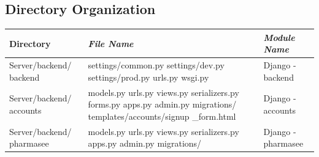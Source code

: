 \documentclass[conference]{IEEEtran}
\begin{document}
\subsection{Directory Organization}
\noindent
\newpage
\par \begin{table}[h!]
\begin{tabular}{|p{}|p{}|p{}|}
\cline{1-3} 
\textbf{Directory} & \textbf{\textit{File Name}}& \textbf{\textit{Module Name}}\\
\hline
Server/backend/ backend &settings/common.py \newline\newline settings/dev.py \newline\newline settings/prod.py \newline\newline urls.py wsgi.py&Django - backend\\
\hline
Server/backend/ accounts &models.py \newline\newline urls.py \newline\newline views.py \newline\newline serializers.py \newline\newline forms.py \newline\newline apps.py \newline\newline admin.py \newline\newline migrations/ \newline\newline templates/accounts/signup  \_form.html&Django - accounts\\
\hline
Server/backend/ pharmasee &models.py \newline\newline urls.py \newline\newline views.py \newline\newline serializers.py \newline\newline apps.py \newline\newline admin.py \newline\newline migrations/ &Django - pharmasee\\

\end{tabular}
\end{table}
\end{document}
